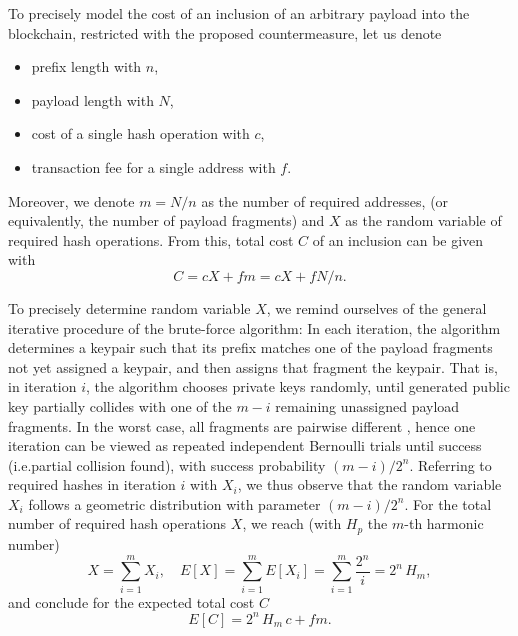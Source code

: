 \documentclass[a4paper,11pt,titlepage]{scrbook}
\begin{document}
To precisely model the cost of an inclusion of an arbitrary payload into the blockchain, restricted with the proposed countermeasure, let us denote 
\begin{itemize}[noitemsep]
    \item prefix length with $n$,
    \item payload length with $N$,
    \item cost of a single hash operation with $c$,
    \item transaction fee for a single address with $f$.
\end{itemize}
Moreover, we denote $m=N/n$ as the number of required addresses, (or equivalently, the number of payload fragments) and $X$ as the random variable of required hash operations.
From this, total cost $C$ of an inclusion can be given with
\[ C =  c X + fm = c X + fN/n . \]

To precisely determine random variable $X$, we remind ourselves of the general iterative procedure of the brute-force algorithm:
In each iteration, the algorithm determines a keypair such that its prefix matches one of the payload fragments not yet assigned a keypair, and then assigns that fragment the keypair.
That is, in iteration $i$, the algorithm chooses private keys randomly, until generated public key partially collides with one of the $m-i$ remaining unassigned payload fragments.
In the worst case, all fragments are pairwise different%
, hence one iteration can be viewed as repeated independent Bernoulli trials until success (i.e.\@ partial collision found), with success probability $(m-i)/2^n$.  
Referring to required hashes in iteration $i$ with $X_i$, we thus observe that the random variable $X_i$ follows a geometric distribution with parameter $(m-i)/2^n$.
For the total number of required hash operations $X$, we reach (with $H_p$ the $m$-th harmonic number)
\[ X = \sum_{i=1}^{m} X_i, \quad E[X] = \sum_{i=1}^{m} E[X_i] = \sum_{i=1}^{m}\frac{2^n}{i} = 2^n\, H_m, \]
and conclude for the expected total cost $C$
\begin{equation}
    E[C] = 2^n\, H_m\,c + fm.\label{eq:totalcost}
\end{equation}

\end{document}
